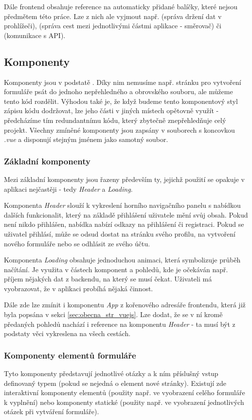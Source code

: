 		Dále frontend obsahuje reference na automaticky přidané balíčky, které nejsou předmětem této práce. Lze z nich ale vyjmout např.  (správa držení dat v prohlížeči),  (správa cest mezi jednotlivými částmi aplikace - směrovač) či  (komunikace s API).
	
	\subsection{Komponenty}
	Komponenty jsou v podstatě . Díky nim nemusíme např. stránku pro vytvoření formuláře psát do jednoho nepřehledného a obrovského souboru, ale můžeme tento kód rozdělit. Výhodou také je, že když budeme tento komponentový styl zápisu kódu dodržovat, lze jeho části v jiných místech opětovně využít - předcházíme tím redundantnímu kódu, který zbytečně znepřehledňuje celý projekt. Všechny zmíněné komponenty jsou zapsány v souborech s koncovkou \textit{.vue} a disponují stejným jménem jako samotný soubor.
		
		\subsubsection{Základní komponenty} %
		Mezi základní komponenty jsou řazeny především ty, jejichž použití se opakuje v aplikaci nejčastěji - tedy \textit{Header} a \textit{Loading}. 
		
		Komponenta \textit{Header} slouží k vykreslení horního navigačního panelu s nabídkou dalších funkcionalit, který na základě přihlášení uživatele mění svůj obsah. Pokud není nikdo přihlášen, nabídka nabízí odkazy na přihlášení či registraci. Pokud se uživatel přihlásí, může se odsud dostat na stránku svého profilu, na vytvoření nového formuláře nebo se odhlásit ze svého účtu.
		
		Komponenta \textit{Loading} obsahuje jednoduchou animaci, která symbolizuje průběh načítání. Je využita v částech komponent a pohledů, kde je očekáván např. příjem nějakých dat z backendu, na který se musí čekat. Uživateli má vyobrazovat, že v aplikaci probíhá nějaká činnost.
		
		Dále zde lze zmínit i komponentu \textit{App} z kořenového adresáře frontendu, která již byla popsána v sekci \ref{sec:obecna_str_vuejs}. Lze dodat, že se v ní kromě předaných pohledů nachází i reference na komponentu \textit{Header} - ta musí být z podstaty věci vykreslena na všech cestách.
		
		\subsubsection{Komponenty elementů formuláře} %
		Tyto komponenty představují jednotlivé otázky a k ním příslušný vstup definovaný typem (pokud se nejedná o element nové stránky). Existují zde interaktivní komponenty elementů (použity např. ve vyobrazení celého formuláře k vyplnění) nebo komponenty statické (použity např. ve vyobrazení jednotlivých otázek při vytváření formuláře).
		
